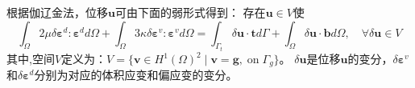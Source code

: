 根据伽辽金法，位移$\boldsymbol u$可由下面的弱形式得到：
存在$\boldsymbol u \in V$使
\begin{equation}\label{weak_penalty}
\int_\Omega 2\mu \delta \boldsymbol \varepsilon^d : \boldsymbol \varepsilon^d d\Omega +
\int_\Omega 3\kappa \delta \boldsymbol \varepsilon^v : \boldsymbol \varepsilon^v d\Omega =
\int_{\Gamma_t} \delta \boldsymbol u \cdot \boldsymbol t d\Gamma + \int_\Omega \delta \boldsymbol u \cdot \boldsymbol b d\Omega, \quad
\forall \delta \boldsymbol u \in V
\end{equation}
其中,空间$V$定义为：$V=\{\boldsymbol v \in H^1(\Omega)^2\;\vert\;\boldsymbol v = \boldsymbol g, \; \textrm{on} \; \Gamma_g\}$。
$\delta \boldsymbol u$是位移$\boldsymbol u $的变分，$\delta\boldsymbol \varepsilon^v$和$\delta\boldsymbol \varepsilon^d $分别为对应的体积应变和偏应变的变分。

